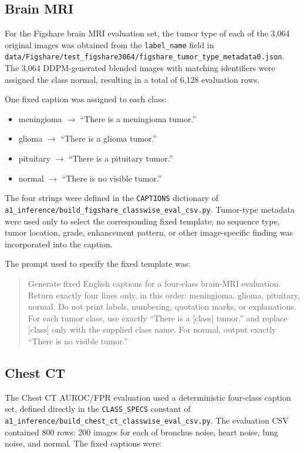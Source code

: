 \subsection{Brain MRI}

For the Figshare brain MRI evaluation set, the tumor type of each of the 3,064 original images was obtained from the \texttt{label\_name} field in \texttt{data/Figshare/test\_figshare3064/figshare\_tumor\_type\_metadata0.json}. The 3,064 DDPM-generated blended images with matching identifiers were assigned the class normal, resulting in a total of 6,128 evaluation rows.

One fixed caption was assigned to each class:

\begin{itemize}
  \item meningioma $\rightarrow$ ``There is a meningioma tumor.''
  \item glioma $\rightarrow$ ``There is a glioma tumor.''
  \item pituitary $\rightarrow$ ``There is a pituitary tumor.''
  \item normal $\rightarrow$ ``There is no visible tumor.''
\end{itemize}

The four strings were defined in the \texttt{CAPTIONS} dictionary of \texttt{a1\_inference/build\_figshare\_classwise\_eval\_csv.py}. Tumor-type metadata were used only to select the corresponding fixed template; no sequence type, tumor location, grade, enhancement pattern, or other image-specific finding was incorporated into the caption.

The prompt used to specify the fixed template was:

\begin{quote}
Generate fixed English captions for a four-class brain-MRI evaluation. Return exactly four lines only, in this order: meningioma, glioma, pituitary, normal. Do not print labels, numbering, quotation marks, or explanations. For each tumor class, use exactly ``There is a [class] tumor.'' and replace [class] only with the supplied class name. For normal, output exactly ``There is no visible tumor.''
\end{quote}

\subsection{Chest CT}

The Chest CT AUROC/FPR evaluation used a deterministic four-class caption set, defined directly in the \texttt{CLASS\_SPECS} constant of \texttt{a1\_inference/build\_chest\_ct\_classwise\_eval\_csv.py}. The evaluation CSV contained 800 rows: 200 images for each of bronchus noise, heart noise, lung noise, and normal. The fixed captions were:

